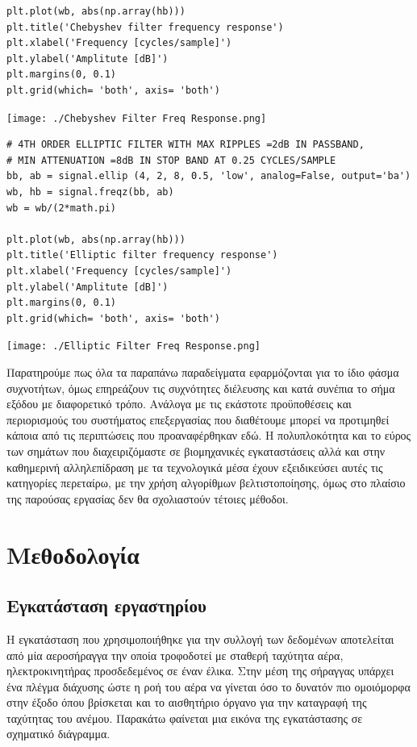 \documentclass[breaklines=true, 12pt]{article}
\begin{document}
{{{\begin{verbatim}
plt.plot(wb, abs(np.array(hb)))
plt.title('Chebyshev filter frequency response')
plt.xlabel('Frequency [cycles/sample]')
plt.ylabel('Amplitute [dB]')
plt.margins(0, 0.1)
plt.grid(which= 'both', axis= 'both')
\end{verbatim}

\begin{center}
\texttt{[image: ./Chebyshev Filter Freq Response.png]}
\end{center}

\begin{verbatim}
# 4TH ORDER ELLIPTIC FILTER WITH MAX RIPPLES =2dB IN PASSBAND,
# MIN ATTENUATION =8dB IN STOP BAND AT 0.25 CYCLES/SAMPLE
bb, ab = signal.ellip (4, 2, 8, 0.5, 'low', analog=False, output='ba')
wb, hb = signal.freqz(bb, ab)
wb = wb/(2*math.pi)

plt.plot(wb, abs(np.array(hb)))
plt.title('Elliptic filter frequency response')
plt.xlabel('Frequency [cycles/sample]')
plt.ylabel('Amplitute [dB]')
plt.margins(0, 0.1)
plt.grid(which= 'both', axis= 'both')
\end{verbatim}

\begin{center}
\texttt{[image: ./Elliptic Filter Freq Response.png]}
\end{center}

Παρατηρούμε πως όλα τα παραπάνω παραδείγματα εφαρμόζονται για το ίδιο φάσμα
συχνοτήτων, όμως επηρεάζουν τις συχνότητες διέλευσης και κατά συνέπια το
σήμα εξόδου με διαφορετικό τρόπο. Ανάλογα με τις εκάστοτε προϋποθέσεις και
περιορισμούς του συστήματος επεξεργασίας που διαθέτουμε μπορεί να προτιμηθεί
κάποια από τις περιπτώσεις που προαναφέρθηκαν εδώ. Η πολυπλοκότητα και το εύρος
των σημάτων που διαχειριζόμαστε σε βιομηχανικές εγκαταστάσεις αλλά και στην
καθημερινή αλληλεπίδραση με τα τεχνολογικά μέσα έχουν εξειδικεύσει αυτές τις
κατηγορίες περεταίρω, με την χρήση αλγορίθμων βελτιστοποίησης, όμως στο πλαίσιο
της παρούσας εργασίας δεν θα σχολιαστούν τέτοιες μέθοδοι.
\section{Μεθοδολογία}
\label{sec:org47f8e17}
\subsection{Εγκατάσταση εργαστηρίου}
\label{sec:org8e52586}
    Η εγκατάσταση που χρησιμοποιήθηκε για την συλλογή των δεδομένων
αποτελείται από μία αεροσήραγγα την οποία τροφοδοτεί με σταθερή ταχύτητα
αέρα, ηλεκτροκινητήρας προσδεδεμένος σε έναν έλικα. Στην μέση της
σήραγγας υπάρχει ένα πλέγμα διάχυσης ώστε η ροή του αέρα να γίνεται όσο
το δυνατόν πιο ομοιόμορφα στην έξοδο όπου βρίσκεται και το αισθητήριο
όργανο για την καταγραφή της ταχύτητας του ανέμου. Παρακάτω φαίνεται μια
εικόνα της εγκατάστασης σε σχηματικό διάγραμμα.

}}}
\end{document}
